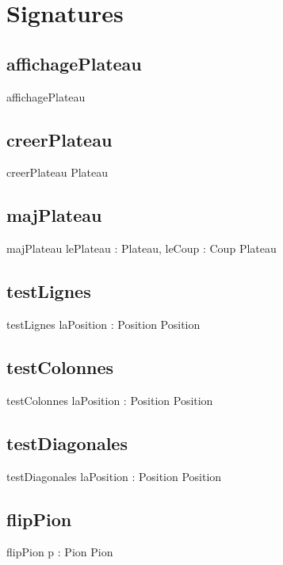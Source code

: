 \section{Signatures}
	\subsection{affichagePlateau}
		\begin{algorithme}
			\signatureprocedure
				{affichagePlateau}
				{}
		\end{algorithme}
	\subsection{creerPlateau}
		\begin{algorithme}
			\signaturefonction
				{creerPlateau}
				{}
				{Plateau}
		\end{algorithme}
	\subsection{majPlateau}
		\begin{algorithme}
			\signaturefonction
				{majPlateau}
				{lePlateau : Plateau, leCoup : Coup}
				{Plateau}
		\end{algorithme}
	\subsection{testLignes}
		\begin{algorithme}
			\signaturefonction
				{testLignes}
				{laPosition : Position}
				{Position}
		\end{algorithme}
	\subsection{testColonnes}
		\begin{algorithme}
			\signaturefonction
				{testColonnes}
				{laPosition : Position}
				{Position}
		\end{algorithme}
	\subsection{testDiagonales}
		\begin{algorithme}
			\signaturefonction
				{testDiagonales}
				{laPosition : Position}
				{Position}
		\end{algorithme}
	\subsection{flipPion}
		\begin{algorithme}
			\signaturefonction
				{flipPion}
				{p : Pion}
				{Pion}
		\end{algorithme}
